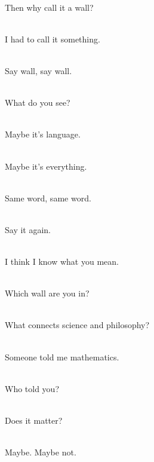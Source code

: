 \begin{lyrics}
\\
Then why call it a wall?

\\
I had to call it something.


\\
Say wall, say wall.

\\
What do you see?

\\
Maybe it’s language.

\\
Maybe it’s everything.

\\
Same word, same word.

\\
Say it again.

\\
I think I know what you mean.

\\
Which wall are you in?


\\
What connects science and philosophy?

\\
Someone told me mathematics.

\\
Who told you?

\\
Does it matter?

\\
Maybe. Maybe not.
\end{lyrics}

